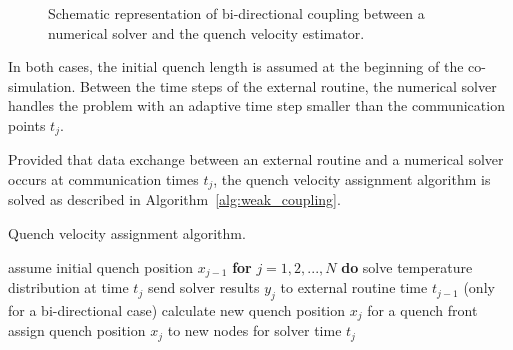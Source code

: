 \begin{figure}[H]
\centering
{}
\caption{Schematic representation of bi-directional coupling between a numerical solver and the quench velocity estimator.}
\label{fig:bidirectional_coupling_scheme}
\end{figure}

In both cases, the initial quench length is assumed at the beginning of the co-simulation. Between the time steps of the external routine, the numerical solver handles the problem with an adaptive time step smaller than the communication points $t_j$.

Provided that data exchange between an external routine and a numerical solver occurs at communication times $t_j$, the quench velocity assignment algorithm is solved as described in Algorithm~\ref{alg:weak_coupling}.

\begin{algorithm}[H]
  \caption{Quench velocity assignment algorithm.}
  \label{alg:weak_coupling}
  \begin{algorithmic}[1]
    \STATE assume initial quench position $x_{j-1}$ 
    \STATE \textbf{for} $j=1,2,...,N$ \textbf{do}
    \STATE \hspace{0.5cm} solve temperature distribution at time $t_j$
    \STATE \hspace{0.5cm} send solver results $y_{j}$ to external routine time $t_{j-1}$ (only for a bi-directional case)
    \STATE \hspace{0.5cm} calculate new quench position $x_{j}$ for a quench front
    \STATE \hspace{0.5cm} assign quench position $x_{j}$ to new nodes for solver time  $t_j$
  \end{algorithmic}
\end{algorithm}

